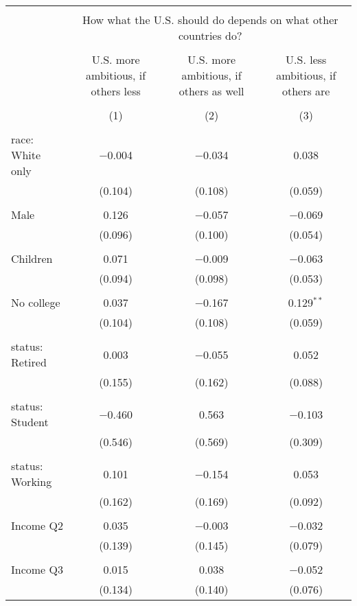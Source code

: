 
\begin{tabular}{@{\extracolsep{5pt}}lccc} 
\\[-1.8ex]\hline 
\hline \\[-1.8ex] 
 & \multicolumn{3}{c}{How what the U.S. should do depends on what other countries do?} \\ 
\cline{2-4} 
\\[-1.8ex] & U.S. more ambitious, if others less & U.S. more ambitious, if others as well & U.S. less ambitious, if others are \\ 
\\[-1.8ex] & (1) & (2) & (3)\\ 
\hline \\[-1.8ex] 
 race: White only & $-$0.004 & $-$0.034 & 0.038 \\ 
  & (0.104) & (0.108) & (0.059) \\ 
  & & & \\ 
 Male & 0.126 & $-$0.057 & $-$0.069 \\ 
  & (0.096) & (0.100) & (0.054) \\ 
  & & & \\ 
 Children & 0.071 & $-$0.009 & $-$0.063 \\ 
  & (0.094) & (0.098) & (0.053) \\ 
  & & & \\ 
 No college & 0.037 & $-$0.167 & 0.129$^{**}$ \\ 
  & (0.104) & (0.108) & (0.059) \\ 
  & & & \\ 
 status: Retired & 0.003 & $-$0.055 & 0.052 \\ 
  & (0.155) & (0.162) & (0.088) \\ 
  & & & \\ 
 status: Student & $-$0.460 & 0.563 & $-$0.103 \\ 
  & (0.546) & (0.569) & (0.309) \\ 
  & & & \\ 
 status: Working & 0.101 & $-$0.154 & 0.053 \\ 
  & (0.162) & (0.169) & (0.092) \\ 
  & & & \\ 
 Income Q2 & 0.035 & $-$0.003 & $-$0.032 \\ 
  & (0.139) & (0.145) & (0.079) \\ 
  & & & \\ 
 Income Q3 & 0.015 & 0.038 & $-$0.052 \\ 
  & (0.134) & (0.140) & (0.076) \\ 

\end{tabular}
